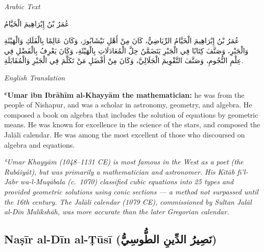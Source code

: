 \documentclass[11pt,a4paper]{article}
\def\RL#1{\beginR#1\endR}
\newcommand{\cnote}[1]{\textcolor{notecolor}{\textit{#1}}}
\newcommand{\textarabic}[1]{{\arabicfont\RL{#1}}}
\newenvironment{arabiccol}{%
  \begin{minipage}[t]{0.48\textwidth}%
  \begin{tcolorbox}[colback=leftbg,colframe=rulecolor,boxrule=0.4pt,arc=2pt,left=5pt,right=5pt,top=5pt,bottom=5pt]%
  \centering\textit{\footnotesize Arabic Text}\\[0.4em]%
  \raggedright\arabicfont\small%
}{%
  \end{tcolorbox}%
  \end{minipage}%
}
\newenvironment{englishcol}{%
  \begin{minipage}[t]{0.48\textwidth}%
  \begin{tcolorbox}[colback=rightbg,colframe=rulecolor,boxrule=0.4pt,arc=2pt,left=5pt,right=5pt,top=5pt,bottom=5pt]%
  \centering\textit{\footnotesize English Translation}\\[0.4em]%
  \raggedright\small%
}{%
  \end{tcolorbox}%
  \end{minipage}%
}
\begin{document}
\noindent
\begin{arabiccol}
\beginR
عُمَرُ بْنُ إِبْرَاهِيمَ الْخَيَّامُ

عُمَرُ بْنُ إِبْرَاهِيمَ الْخَيَّامُ الرِّيَاضِيُّ، كَانَ مِنْ أَهْلِ نَيْشَابُورَ، وَكَانَ عَالِمًا بِالْفَلَكِ وَالْهَيْئَةِ وَالْجَبْرِ، وَصَنَّفَ كِتَابًا فِي الْجَبْرِ يَتَضَمَّنُ حِلَّ الْمُعَادَلَاتِ بِالْهَيْئَةِ، وَكَانَ يَعْرِفُ بِالْفَضْلِ فِي عِلْمِ النُّجُومِ، وَصَنَّفَ التَّقْوِيمَ الْجَلَالِيَّ، وَكَانَ مِنْ أَفْضَلِ مَنْ تَكَلَّمَ فِي الْجَبْرِ وَالْمُقَابَلَةِ.
\endR
\end{arabiccol}
\hfill
\begin{englishcol}
\textbf{ʿUmar ibn Ibrāhīm al-Khayyām the mathematician:} he was from the people of Nishapur, and was a scholar in astronomy, geometry, and algebra. He composed a book on algebra that includes the solution of equations by geometric means. He was known for excellence in the science of the stars, and composed the Jalālī calendar. He was among the most excellent of those who discoursed on algebra and equations.

\cnote{ʿUmar Khayyām (1048--1131 CE) is most famous in the West as a poet (the \textit{Rubáiyát}), but was primarily a mathematician and astronomer. His \textit{Kitāb fī'l-Jabr wa-l-Muqābala} (c.~1070) classified cubic equations into 25 types and provided geometric solutions using conic sections --- a method not surpassed until the 16th century. The Jalālī calendar (1079 CE), commissioned by Sultan Jalāl al-Dīn Malikshāh, was more accurate than the later Gregorian calendar.}
\end{englishcol}

\par\vspace{0.5em}

\subsection{Naṣīr al-Dīn al-Ṭūsī (\textarabic{نَصِيرُ الدِّينِ الطُّوسِيُّ})}
\end{document}
